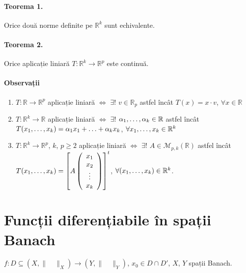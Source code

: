 \paragraph{Teorema 1.}
Orice două norme definite pe $\mathbb{R}^{k}$ sunt echivalente.

\paragraph{Teorema 2.}
Orice aplicație liniară $T: \mathbb{R}^{k} \rightarrow \mathbb{R}^{p}$ este continuă.

\paragraph{Observații}
\begin{enumerate}[label=\emph{\arabic*})]
	\item $T: \mathbb{R} \rightarrow \mathbb{R}^{p}$ aplicație liniară $\Leftrightarrow$ $\exists!$ $v \in \mathbb{R}_{p}$ astfel încât $T(x) = x \cdot v$, $\forall x \in \mathbb{R}$
	\item $T: \mathbb{R}^{k} \rightarrow \mathbb{R}$ aplicație liniară $\Leftrightarrow$ $\exists!$ $\alpha_{1}, \mathellipsis, \alpha_{k} \in \mathbb{R}$ astfel încât
			  $T(x_{1}, \mathellipsis, x_{k}) = \alpha_{1}x_{1} + \mathellipsis + \alpha_{k}x_{k}$, $\forall x_{1}, \mathellipsis, x_{k} \in \mathbb{R}^{k}$
	\item $T: \mathbb{R}^{k} \rightarrow \mathbb{R}^{p}$, $k$, $p \geq 2$ aplicație liniară $\Leftrightarrow$ $\exists!$ $A \in \mathcal{M}_{p,k}(\mathbb{R})$ astfel încât \\
			  $T(x_{1}, \mathellipsis, x_{k}) = 
			  \left[
			  A
				  \left(
				  \begin{array}{ccc}
					  x_{1} \\
					  x_{2} \\
					  \vdots \\
					  x_{k}
				  \end{array}
				  \right)
			  \right]^{t}$, $\forall (x_{1}, \mathellipsis, x_{k}) \in \mathbb{R}^{k}$.
\end{enumerate}

\section{Funcții diferențiabile în spații Banach}
$f:D \subseteq (X, \lVert \quad \rVert_{X}) \rightarrow (Y, \lVert \quad \rVert_{Y})$, $x_{0} \in D \cap D'$, $X$, $Y$ spații Banach.

